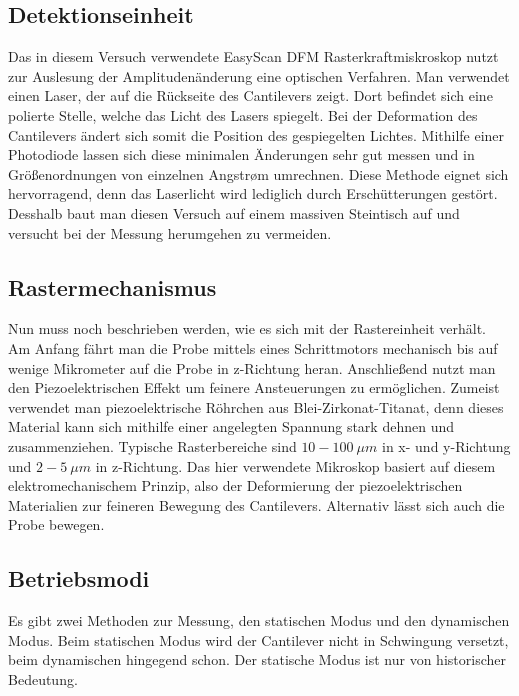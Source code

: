  \subsection{Detektionseinheit}
 
 Das in diesem Versuch verwendete EasyScan DFM Rasterkraftmiskroskop nutzt zur Auslesung der Amplitudenänderung eine optischen Verfahren. 
 Man verwendet einen Laser, der auf die Rückseite des Cantilevers zeigt. 
 Dort befindet sich eine polierte Stelle, welche das Licht des Lasers spiegelt. 
 Bei der Deformation des Cantilevers ändert sich somit die Position des gespiegelten Lichtes.
 Mithilfe einer Photodiode lassen sich diese minimalen Änderungen sehr gut messen und in Größenordnungen von einzelnen Angstrøm umrechnen.
 Diese Methode eignet sich hervorragend, denn das Laserlicht wird lediglich durch Erschütterungen gestört.
 Desshalb baut man diesen Versuch auf einem massiven Steintisch auf und versucht bei der Messung herumgehen zu vermeiden.

\subsection{Rastermechanismus}

Nun muss noch beschrieben werden, wie es sich mit der Rastereinheit verhält.
Am Anfang fährt man die Probe mittels eines Schrittmotors mechanisch bis auf wenige Mikrometer auf die Probe in z-Richtung heran.
Anschließend nutzt man den Piezoelektrischen Effekt um feinere Ansteuerungen zu ermöglichen.
Zumeist verwendet man piezoelektrische Röhrchen aus Blei-Zirkonat-Titanat, denn dieses Material kann sich mithilfe einer angelegten Spannung stark dehnen und zusammenziehen. 
Typische Rasterbereiche sind $10-\SI{100}{\mu m}$ in x- und y-Richtung und $2-\SI{5}{\mu m}$ in z-Richtung.
Das hier verwendete Mikroskop basiert auf diesem elektromechanischem Prinzip, also der Deformierung der piezoelektrischen Materialien zur feineren Bewegung des Cantilevers.
Alternativ lässt sich auch die Probe bewegen.

\subsection{Betriebsmodi}

Es gibt zwei Methoden zur Messung, den statischen Modus und den dynamischen Modus. Beim statischen Modus wird der Cantilever nicht in Schwingung versetzt, beim dynamischen hingegend schon. Der statische Modus ist nur von historischer Bedeutung.

